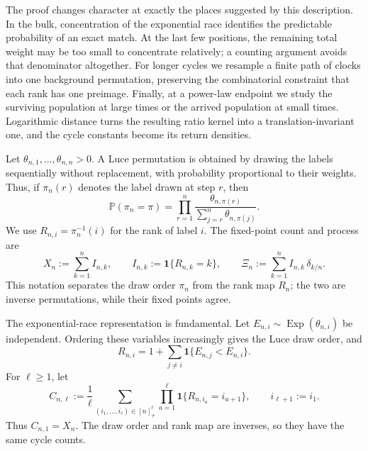 \documentclass[11pt]{article}
\theoremstyle{remark}
\theoremstyle{plain}
\newcommand{\Pp}{\mathbb P}
\newcommand{\one}{\mathbf 1}
\begin{document}
The proof changes character at exactly the places suggested by this
description.  In the bulk, concentration of the exponential race identifies
the predictable probability of an exact match.  At the last few positions,
the remaining total weight may be too small to concentrate relatively; a
counting argument avoids that denominator altogether.  For longer cycles we
resample a finite path of clocks into one background permutation, preserving
the combinatorial constraint that each rank has one preimage.  Finally, at a
power-law endpoint we study the surviving population at large times or the
arrived population at small times.  Logarithmic distance turns the resulting
ratio kernel into a translation-invariant one, and the cycle constants become
its return densities.

Let $\theta_{n,1},\ldots,\theta_{n,n}>0$.  A Luce permutation is obtained by
drawing the labels sequentially without replacement, with probability
proportional to their weights.  Thus, if $\pi_n(r)$ denotes the label drawn at
step $r$, then
\begin{equation}\label{eq:luce-law}
 \Pp(\pi_n=\pi)
 =\prod_{r=1}^n
   \frac{\theta_{n,\pi(r)}}
   {\sum_{j=r}^n\theta_{n,\pi(j)}}.
\end{equation}
We use $R_{n,i}=\pi_n^{-1}(i)$ for the rank of label $i$.  The fixed-point
count and process are
\begin{equation}\label{eq:fixed-process}
 X_n:=\sum_{k=1}^n I_{n,k},\qquad
 I_{n,k}:=\one\{R_{n,k}=k\},\qquad
 \Xi_n:=\sum_{k=1}^n I_{n,k}\,\delta_{k/n}.
\end{equation}
This notation separates the draw order $\pi_n$ from the rank map $R_n$; the
two are inverse permutations, while their fixed points agree.

The exponential-race representation is fundamental.  Let
$E_{n,i}\sim\operatorname{Exp}(\theta_{n,i})$ be independent.  Ordering these
variables increasingly gives the Luce draw order, and
\begin{equation}\label{eq:rank-representation}
 R_{n,i}=1+\sum_{j\ne i}\one\{E_{n,j}<E_{n,i}\}.
\end{equation}
For $\ell\ge1$, let
\begin{equation}\label{eq:cycle-counts}
 C_{n,\ell}:=\frac1\ell
 \sum_{(i_1,\ldots,i_\ell)\in[n]_{\ne}^{\ell}}
 \prod_{a=1}^{\ell}\one\{R_{n,i_a}=i_{a+1}\},
 \qquad i_{\ell+1}:=i_1.
\end{equation}
Thus $C_{n,1}=X_n$.  The draw order and rank map are inverses, so they have
the same cycle counts.
\end{document}
